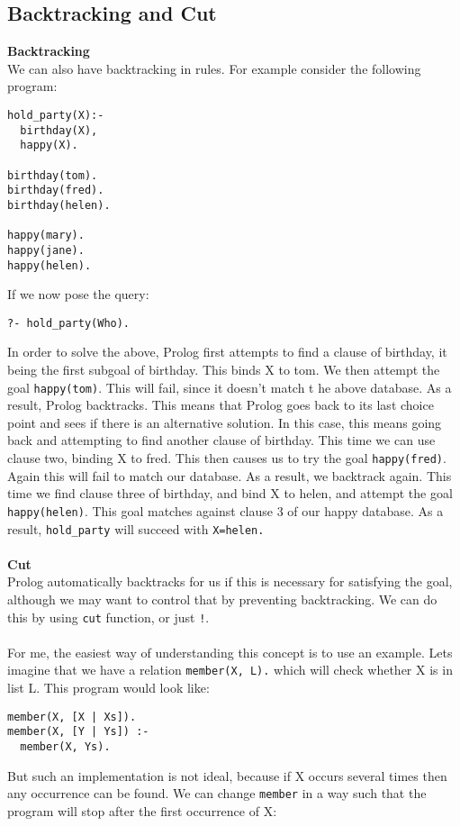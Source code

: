 \documentclass[11pt]{article}
\begin{document}
\subsection{Backtracking and Cut}
\textbf{Backtracking}\\
We can also have backtracking in rules. For example consider the following program:
\begin{lstlisting}
hold_party(X):-
  birthday(X),
  happy(X).
  
birthday(tom).
birthday(fred).
birthday(helen).

happy(mary).
happy(jane).
happy(helen).
\end{lstlisting}
If we now pose the query:
\begin{lstlisting}
?- hold_party(Who).
\end{lstlisting}
In order to solve the above, Prolog first attempts to find a clause of birthday, 
it being the first subgoal of birthday. This binds X to tom.
 We then attempt the goal \texttt{happy(tom)}. This will fail, since it doesn't match t
 he above database. As a result, Prolog backtracks. This means that Prolog goes
  back to its last choice point and sees if there is an alternative solution. 
  In this case, this means going back and attempting to find another clause of birthday. 
  This time we can use clause two, binding X to fred. This then causes 
  us to try the goal \texttt{happy(fred)}. Again this will fail to match our database.
   As a result, we backtrack again. This time we find clause three of birthday,
    and bind X to helen, and attempt the goal \texttt{happy(helen)}. This goal matches 
    against clause 3 of our happy database. As a result, \texttt{hold\_party} will succeed 
    with \texttt{X=helen.}\\\\
\textbf{Cut}\\
Prolog automatically backtracks for us if this is necessary for satisfying the goal, although we may want to control that by preventing backtracking. We can do this by using \texttt{cut} function, or just \texttt{!}.\\\\
For me, the easiest way of understanding this concept is to use an example. Lets imagine that we have a relation \texttt{member(X, L).} which will check whether X is in list L. This program would look like:
\begin{lstlisting}
member(X, [X | Xs]).
member(X, [Y | Ys]) :-
  member(X, Ys).
\end{lstlisting}
But such an implementation is not ideal, because if X occurs several times then any occurrence can be found. We can change \texttt{member} in a way such that the program will stop after the first occurrence of X:
\end{document}
